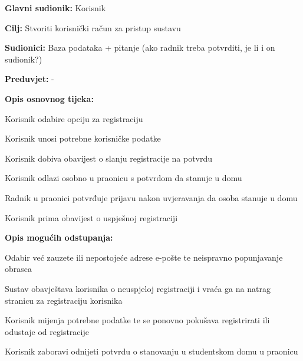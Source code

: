\noindent {}
\begin{packed_item}
	
	\item \textbf{Glavni sudionik: } Korisnik
	\item  \textbf{Cilj:} Stvoriti korisnički račun za pristup sustavu
	\item  \textbf{Sudionici:}  Baza podataka + pitanje (ako radnik treba potvrditi, je li i on sudionik?)
	\item  \textbf{Preduvjet:} -
	\item  \textbf{Opis osnovnog tijeka:}
	
	\item[] \begin{packed_enum}
		
		\item Korisnik odabire opciju za registraciju
		\item Korisnik unosi potrebne korisničke podatke
		\item Korisnik dobiva obavijest o slanju registracije na potvrdu
		\item Korisnik odlazi osobno u praonicu s potvrdom da stanuje u domu 
		\item Radnik u praonici potvrđuje prijavu nakon uvjeravanja da osoba stanuje u domu
		\item Korisnik prima obavijest o uspješnoj registraciji
	\end{packed_enum}
	
	\item  \textbf{Opis mogućih odstupanja:}
	
	\item[] \begin{packed_item}
		
		\item[2.a] Odabir već zauzete ili nepostojeće adrese e-pošte te neispravno popunjavanje obrasca
		\item[] \begin{packed_enum}
			
			\item Sustav obavještava korisnika o neuspjeloj registraciji i vraća ga na natrag stranicu za registraciju korisnika
			\item Korisnik mijenja potrebne podatke te se ponovno pokušava registrirati ili odustaje od registracije
			
		\end{packed_enum}
		
		\item[4.a] Korisnik zaboravi odnijeti potvrdu o stanovanju u studentskom domu u praonicu
		\item[] \begin{packed_enum}
			

\end{packed_enum}
\end{packed_item}
\end{packed_item}
